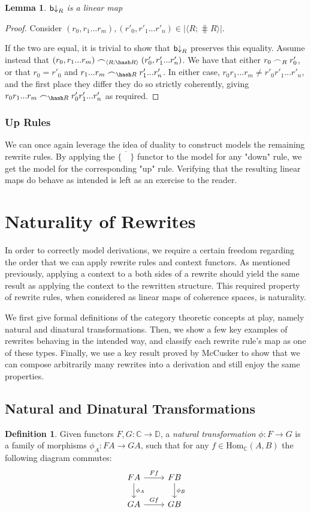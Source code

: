 \documentclass[11pt, oneside]{article}
\theoremstyle{plain}
\newtheorem{lemma}[theorem]{Lemma}
\theoremstyle{definition}
\newtheorem{definition}[theorem]{Definition}
\newcommand{\la}{\langle}
\newcommand{\ra}{\rangle}
\newcommand{\scoh}[1][]{\mathrel{\frown}_{\ifx\\#1\\\else#1\fi}}
\begin{document}
\begin{lemma}
    ${\mathsf b}{\downarrow}_{R}$ is a linear map
\end{lemma}

\begin{proof}
    Consider $(r_0,r_1...r_m),(r'_0,r'_1...r'_n)\in|\la R;\hash R\ra|$.

    If the two are equal, it is trivial to show that ${\mathsf b}{\downarrow}_{R}$ preserves this equality.
    Assume instead that $(r_0,r_1...r_m)\scoh[\la R;\hash R\ra](r'_0,r'_1...r'_n)$.
    We have that either $r_0\scoh[R]r'_0$, or that $r_0=r'_0$ and $r_1...r_m\scoh[\hash R]r'_1...r'_n$.
    In either case, $r_0r_1...r_m\neq r'_0r'_1...r'_n$, and the first place they differ they do so strictly coherently,
    giving $r_0r_1...r_m\scoh[\hash R]r'_0r'_1...r'_n$ as required.
\end{proof}

\subsubsection{Up Rules}
We can once again leverage the idea of duality to construct models the remaining rewrite rules.
By applying the $\overline{\{\quad\}}$ functor to the model for any "down" rule, we get the model for the corresponding "up" rule.
Verifying that the resulting linear maps do behave as intended is left as an exercise to the reader.

\newpage
\section{Naturality of Rewrites}
In order to correctly model derivations, we require a certain freedom regarding the order that we can apply rewrite rules and context functors.
As mentioned previously, applying a context to a both sides of a rewrite should yield the same result as applying the context to the rewritten structure.
This required property of rewrite rules, when considered as linear maps of coherence spaces, is naturality.

We first give formal definitions of the category theoretic concepts at play, namely natural and dinatural transformations. 
Then, we show a few key examples of rewrites behaving in the intended way, and classify each rewrite rule's map as one of these types.
Finally, we use a key result proved by McCusker to show that we can compose arbitrarily many rewrites into a derivation and still enjoy the same properties.

\subsection{Natural and Dinatural Transformations}
\begin{definition}
Given functors $F,G:\mathbb{C}\to\mathbb{D}$, a \textit{natural transformation} $\phi:F\to G$ is a family of morphisms $\phi_A:FA\to GA$, such that for any $f\in \text{Hom}_{\mathbb{C}}(A,B)$ the following diagram commutes:
\[
\begin{tikzcd}
    FA \arrow[r,"Ff"]\arrow[d,"\phi_A"]& FB\arrow[d,"\phi_B"] \\
    GA \arrow[r,"Gf"] & GB
\end{tikzcd}
\]
\end{definition}
\end{document}

